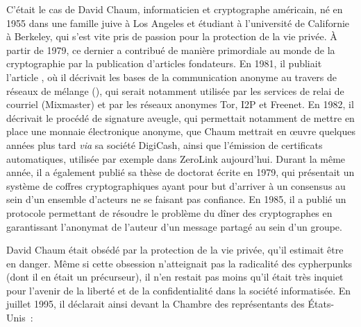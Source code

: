C'était le cas de David Chaum, informaticien et cryptographe américain, né en 1955 dans une famille juive à Los Angeles et étudiant à l'université de Californie à Berkeley, qui s'est vite pris de passion pour la protection de la vie privée. À partir de 1979, ce dernier a contribué de manière primordiale au monde de la cryptographie par la publication d'articles fondateurs. En 1981, il publiait l'article , où il décrivait les bases de la communication anonyme au travers de réseaux de mélange (), qui serait notamment utilisée par les services de relai de courriel (Mixmaster) et par les réseaux anonymes Tor, I2P et Freenet. En 1982, il décrivait le procédé de signature aveugle, qui permettait notamment de mettre en place une monnaie électronique anonyme, que Chaum mettrait en œuvre quelques années plus tard \emph{via} sa société DigiCash, ainsi que l'émission de certificats automatiques, utilisée par exemple dans ZeroLink aujourd'hui. Durant la même année, il a également publié sa thèse de doctorat écrite en 1979, qui présentait un système de coffres cryptographiques ayant pour but d'arriver à un consensus au sein d'un ensemble d'acteurs ne se faisant pas confiance. En 1985, il a publié un protocole permettant de résoudre le problème du dîner des cryptographes en garantissant l'anonymat de l'auteur d'un message partagé au sein d'un groupe. %

David Chaum était obsédé par la protection de la vie privée, qu'il estimait être en danger. Même si cette obsession n'atteignait pas la radicalité des cypherpunks (dont il en était un précurseur), il n'en restait pas moins qu'il était très inquiet pour l'avenir de la liberté et de la confidentialité dans la société informatisée. En juillet 1995, il déclarait ainsi devant la Chambre des représentants des États-Unis~:

